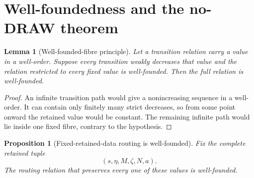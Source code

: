 \documentclass[11pt]{article}
\newtheorem{lemma}[theorem]{Lemma}
\newtheorem{proposition}[theorem]{Proposition}
\begin{document}
\section{Well-foundedness and the no-DRAW theorem}\label{sec:global}

\begin{lemma}[Well-founded-fibre principle]\label{lem:fibre-principle}
Let a transition relation carry a value in a well-order.  Suppose every
transition weakly decreases that value and the relation restricted to every
fixed value is well-founded.  Then the full relation is well-founded.
\end{lemma}

\begin{proof}
An infinite transition path would give a nonincreasing sequence in a
well-order.  It can contain only finitely many strict decreases, so from some
point onward the retained value would be constant.  The remaining infinite
path would lie inside one fixed fibre, contrary to the hypothesis.
\end{proof}

\begin{proposition}[Fixed-retained-data routing is well-founded]
\label{prop:fixed-fibre}
Fix the complete retained tuple
\[
 (s,\eta,M,\zeta,N,a).
\]
The routing relation that preserves every one of these values is
well-founded.
\end{proposition}
\end{document}
